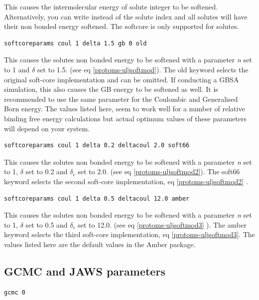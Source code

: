 \documentclass[letterpaper,10pt,english]{sphinxmanual}
\begin{document}
This causes the intermolecular energy of solute integer to be softened. Alternatively, you can write  instead of the solute index and all solutes will have their non bonded energy softened. The softcore is only supported for solutes.

\begin{Verbatim}[commandchars=\\\{\}]
softcoreparams coul 1 delta 1.5 gb 0 old
\end{Verbatim}

This causes the solutes non bonded energy to be softened with a parameter \emph{n} set to 1 and \(\delta\) set to 1.5. (see eq \eqref{protoms-uljsoftmod}). The old keyword selects the original soft-core implementation and can be omitted. If conducting a GBSA simulation, this also causes the GB energy to be softened as well. It is recommended to use the same parameter for the Coulombic and Generalised Born energy. The values listed here, seem to work well for a number of relative binding free energy calculations but actual optimum values of these parameters will depend on your system.

\begin{Verbatim}[commandchars=\\\{\}]
softcoreparams coul 1 delta 0.2 deltacoul 2.0 soft66
\end{Verbatim}

This causes the solutes non bonded energy to be softened with a parameter \emph{n} set to 1, \(\delta\) set to 0.2 and \(\delta_c\) set to 2.0. (see eq \eqref{protoms-uljsoftmod2}). The soft66 keyword selects the second soft-core implementation, eq \eqref{protoms-uljsoftmod2} .

\begin{Verbatim}[commandchars=\\\{\}]
softcoreparams coul 1 delta 0.5 deltacoul 12.0 amber
\end{Verbatim}

This causes the solutes non bonded energy to be softened with a parameter \emph{n} set to 1, \(\delta\) set to 0.5 and \(\delta_c\)  set to 12.0. (see eq \eqref{protoms-uljsoftmod3} ). The amber keyword selects the third soft-core implementation, eq \eqref{protoms-uljsoftmod3}. The values listed here are the default values in the Amber package.


\subsection{GCMC and JAWS parameters}
\label{protoms:gcmc-and-jaws-parameters}
\begin{Verbatim}[commandchars=\\\{\}]
gcmc 0
\end{Verbatim}
\end{document}
